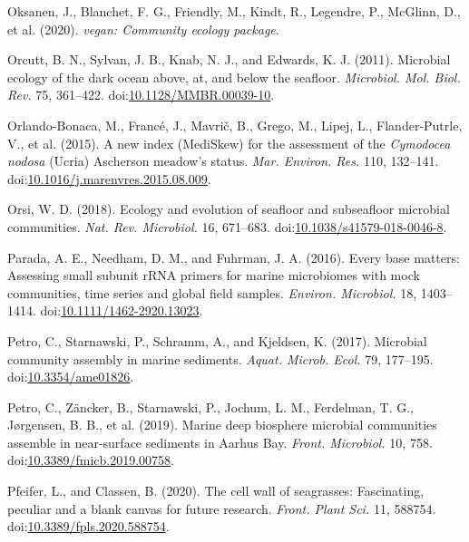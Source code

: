 \documentclass[12pt,]{article}
\begin{document}
\leavevmode\hypertarget{ref-Oksanen2020}{}%
Oksanen, J., Blanchet, F. G., Friendly, M., Kindt, R., Legendre, P.,
McGlinn, D., et al. (2020). \emph{vegan: Community ecology package}.

\leavevmode\hypertarget{ref-Orcutt2011a}{}%
Orcutt, B. N., Sylvan, J. B., Knab, N. J., and Edwards, K. J. (2011).
Microbial ecology of the dark ocean above, at, and below the seafloor.
\emph{Microbiol. Mol. Biol. Rev.} 75, 361--422.
doi:\href{https://doi.org/10.1128/MMBR.00039-10}{10.1128/MMBR.00039-10}.

\leavevmode\hypertarget{ref-Orlando-Bonaca2015}{}%
Orlando-Bonaca, M., Francé, J., Mavrič, B., Grego, M., Lipej, L.,
Flander-Putrle, V., et al. (2015). A new index (MediSkew) for the
assessment of the \emph{Cymodocea nodosa} (Ucria) Ascherson meadow's
status. \emph{Mar. Environ. Res.} 110, 132--141.
doi:\href{https://doi.org/10.1016/j.marenvres.2015.08.009}{10.1016/j.marenvres.2015.08.009}.

\leavevmode\hypertarget{ref-Orsi2018}{}%
Orsi, W. D. (2018). Ecology and evolution of seafloor and subseafloor
microbial communities. \emph{Nat. Rev. Microbiol.} 16, 671--683.
doi:\href{https://doi.org/10.1038/s41579-018-0046-8}{10.1038/s41579-018-0046-8}.

\leavevmode\hypertarget{ref-Parada2016a}{}%
Parada, A. E., Needham, D. M., and Fuhrman, J. A. (2016). Every base
matters: Assessing small subunit rRNA primers for marine microbiomes
with mock communities, time series and global field samples.
\emph{Environ. Microbiol.} 18, 1403--1414.
doi:\href{https://doi.org/10.1111/1462-2920.13023}{10.1111/1462-2920.13023}.

\leavevmode\hypertarget{ref-Petro2017a}{}%
Petro, C., Starnawski, P., Schramm, A., and Kjeldsen, K. (2017).
Microbial community assembly in marine sediments. \emph{Aquat. Microb.
Ecol.} 79, 177--195.
doi:\href{https://doi.org/10.3354/ame01826}{10.3354/ame01826}.

\leavevmode\hypertarget{ref-Petro2019}{}%
Petro, C., Zäncker, B., Starnawski, P., Jochum, L. M., Ferdelman, T. G.,
Jørgensen, B. B., et al. (2019). Marine deep biosphere microbial
communities assemble in near-surface sediments in Aarhus Bay.
\emph{Front. Microbiol.} 10, 758.
doi:\href{https://doi.org/10.3389/fmicb.2019.00758}{10.3389/fmicb.2019.00758}.

\leavevmode\hypertarget{ref-Pfeifer2020}{}%
Pfeifer, L., and Classen, B. (2020). The cell wall of seagrasses:
Fascinating, peculiar and a blank canvas for future research.
\emph{Front. Plant Sci.} 11, 588754.
doi:\href{https://doi.org/10.3389/fpls.2020.588754}{10.3389/fpls.2020.588754}.
\end{document}
